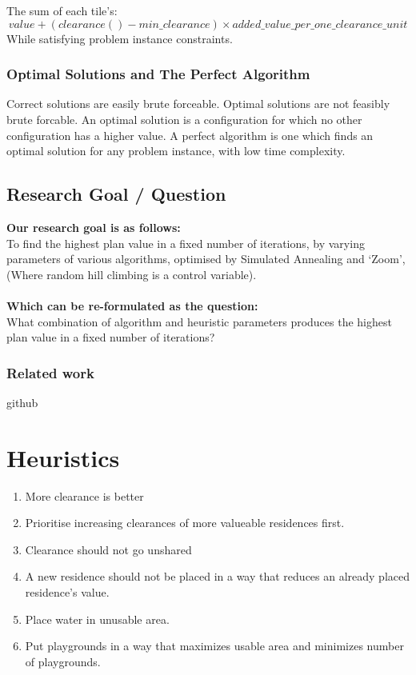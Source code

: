 \documentclass{article}
\begin{document}
The sum of each tile's:
$$value + (clearance() - min\_clearance) \times added\_value\_per\_one\_clearance\_unit$$ While satisfying problem instance constraints.

\subsubsection{Optimal Solutions and The Perfect Algorithm}

Correct solutions are easily brute forceable. Optimal solutions are not feasibly brute forcable. An optimal solution is a configuration for which no other configuration has a higher value. A perfect algorithm is one which finds an optimal solution for any problem instance, with low time complexity.

\subsection{Research Goal / Question}
\textbf{Our research goal is as follows:}
\\To find the highest plan value in a fixed number of iterations, by varying
parameters of various algorithms, optimised by Simulated Annealing and
‘Zoom’, (Where random hill climbing is a control variable).
\\\\\textbf{Which can be re-formulated as the question:}
\\What combination of algorithm and heuristic parameters produces the
highest plan value in a fixed number of iterations?

\subsubsection{Related work}

github

\section{Heuristics}

\begin{enumerate}
\item More clearance is better
\item Prioritise increasing clearances of more valueable residences first.
\item Clearance should not go unshared
\item A new residence should not be placed in a way that reduces an already placed residence's value.
\item Place water in unusable area.
\item Put playgrounds in a way that maximizes usable area and minimizes number of playgrounds.
\end{enumerate}
\end{document}
